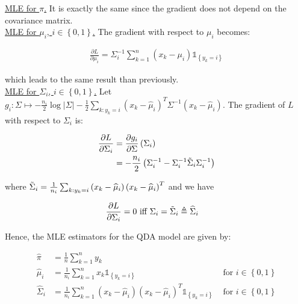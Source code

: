 \documentclass[a4paper, 11pt]{report}
\begin{document}
\underline{MLE for $\pi$.} It is exactly the same since the gradient does not depend on the covariance matrix. \\

\underline{MLE for $\mu_{i}$, $i \in \left\{ 0, 1 \right\}$.} The gradient with respect to $\mu_{i}$ becomes:

\begin{equation*}
    \begin{aligned}
    \frac{\partial L}{\partial \mu_{i}} = \Sigma_{i}^{-1} \sum_{k=1}^{n} \left( x_{k} - \mu_{i} \right) \mathds{1}_{\left\{ y_k = i \right\}}
    \end{aligned}
\end{equation*}

which leads to the same result than previously. \\

\underline{MLE for $\Sigma_{i}$, $i \in \left\{ 0, 1 \right\}$.} Let $g_{i}: \Sigma \mapsto - \frac{n_{i}}{2} \log \left| \Sigma \right| - \frac{1}{2} \sum_{k: y_{k}=i} \left( x_{k} - \widehat{\mu}_{i} \right)^{T} \Sigma^{-1} \left( x_{k} - \widehat{\mu}_{i} \right)$. The gradient of $L$ with respect to $\Sigma_{i}$ is:

\begin{equation*}
    \begin{aligned}
    \frac{\partial L}{\partial \Sigma_{i}} &=  \frac{\partial g_{i}}{\partial \Sigma} \left( \Sigma_{i} \right) \\
    &= - \frac{n_{i}}{2} \left( \Sigma_{i}^{-1} - \Sigma_{i}^{-1} \Tilde{\Sigma}_{i} \Sigma_{i}^{-1} \right)
    \end{aligned}
\end{equation*}

where $\Tilde{\Sigma}_{i} = \frac{1}{n_{i}} \sum_{k:y_{k}=i} \left( x_{k} - \widehat{\mu}_{i} \right) \left( x_{k} - \widehat{\mu}_{i} \right)^{T}$ and we have

\begin{equation*}
    \begin{aligned}
    \frac{\partial L}{\partial \Sigma_{i}} = 0 &\text{ iff } \Sigma_{i} = \Tilde{\Sigma}_{i} \triangleq \widehat{\Sigma}_{i}
    \end{aligned}
\end{equation*}


Hence, the MLE estimators for the QDA model are given by:

\begin{equation*}
    \boxed{\begin{aligned}
    \widehat{\pi} &= \frac{1}{n} \sum_{k=1}^{n} y_{k} \\
    \widehat{\mu}_{i} &= \frac{1}{n_{i}} \sum_{k=1}^{n} x_{k} \mathds{1}_{\left\{ y_{k} = i \right\}} & \text{ for } i \in \left\{ 0, 1 \right\} \\
    \widehat{\Sigma}_{i} &= \frac{1}{n_{i}} \sum_{k=1}^{n} \left( x_{k} - \widehat{\mu}_{i} \right) \left( x_{k} - \widehat{\mu}_{i} \right)^{T} \mathds{1}_{\left\{ y_{k} = i \right\}} & \text{ for } i \in \left\{ 0, 1 \right\}
    \end{aligned}}
\end{equation*}
\end{document}
